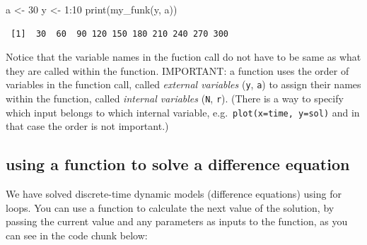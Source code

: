 \documentclass[
  letterpaper,
  DIV=11,
  numbers=noendperiod]{scrreprt}
\newenvironment{Shaded}{\begin{snugshade}}{\end{snugshade}}
\newcommand{\DecValTok}[1]{\textcolor[rgb]{0.68,0.00,0.00}{#1}}
\newcommand{\FunctionTok}[1]{\textcolor[rgb]{0.28,0.35,0.67}{#1}}
\newcommand{\NormalTok}[1]{\textcolor[rgb]{0.00,0.23,0.31}{#1}}
\newcommand{\OtherTok}[1]{\textcolor[rgb]{0.00,0.23,0.31}{#1}}
\newcommand{\SpecialCharTok}[1]{\textcolor[rgb]{0.37,0.37,0.37}{#1}}
\begin{document}
\begin{Shaded}
\begin{Highlighting}[]
\NormalTok{a }\OtherTok{\textless{}{-}} \DecValTok{30}
\NormalTok{y }\OtherTok{\textless{}{-}} \DecValTok{1}\SpecialCharTok{:}\DecValTok{10}
\FunctionTok{print}\NormalTok{(}\FunctionTok{my\_funk}\NormalTok{(y, a))}
\end{Highlighting}
\end{Shaded}

\begin{verbatim}
 [1]  30  60  90 120 150 180 210 240 270 300
\end{verbatim}

Notice that the variable names in the fuction call do not have to be
same as what they are called within the function. IMPORTANT: a function
uses the order of variables in the function call, called \emph{external
variables} (\texttt{y}, \texttt{a}) to assign their names within the
function, called \emph{internal variables} (\texttt{N}, \texttt{r}).
(There is a way to specify which input belongs to which internal
variable, e.g.~\texttt{plot(x=time,\ y=sol)} and in that case the order
is not important.)

\hypertarget{using-a-function-to-solve-a-difference-equation}{%
\subsection{using a function to solve a difference
equation}\label{using-a-function-to-solve-a-difference-equation}}

We have solved discrete-time dynamic models (difference equations) using
for loops. You can use a function to calculate the next value of the
solution, by passing the current value and any parameters as inputs to
the function, as you can see in the code chunk below:
\end{document}

